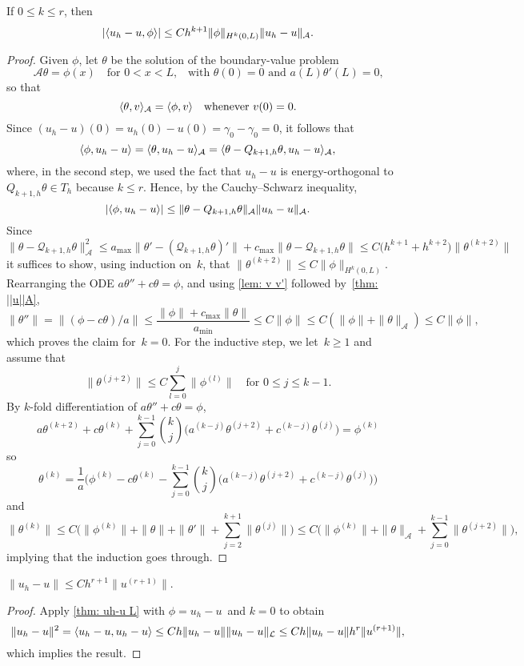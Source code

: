 \begin{theorem}
If $0\le k\le r$, then
\[
|\langle u_h-u,\phi\rangle|\le Ch^{k+1}\|\phi\|_{H^k(0,L)}\|u_h-u\|_{\mathcal{A}}.
\]
\end{theorem}
\begin{proof}
Given $\phi$, let $\theta$ be the solution of the boundary-value problem
\[
\mathcal{A}\theta=\phi(x)\quad\text{for $0<x<L$,}
	\quad\text{with $\theta(0)=0$ and $a(L)\theta'(L)=0$,}
\]
so that
\[
\langle\theta,v\rangle_{\mathcal{A}}=\langle\phi,v\rangle\quad\text{whenever $v(0)=0$.}
\]
Since $(u_h-u)(0)=u_h(0)-u(0)=\gamma_0-\gamma_0=0$, it follows that
\[
\langle\phi,u_h-u\rangle=\langle\theta,u_h-u\rangle_{\mathcal{A}}
	=\langle\theta-Q_{k+1,h}\theta,u_h-u\rangle_{\mathcal{A}},
\]
where, in the second step, we used the fact that $u_h-u$ is energy-orthogonal
to $Q_{k+1,h}\theta\in T_h$ because $k\le r$.  Hence, by the Cauchy--Schwarz 
inequality,
\[
|\langle\phi,u_h-u\rangle|\le\|\theta-Q_{k+1,h}\theta\|_{\mathcal{A}}
	\|u_h-u\|_{\mathcal{A}}.
\]
Since
\[
\|\theta-\mathcal{Q}_{k+1,h}\theta\|_{\mathcal{A}}^2
	\le a_{\max}\|\theta'-(\mathcal{Q}_{k+1,h}\theta)'\|
	+c_{\max}\|\theta-\mathcal{Q}_{k+1,h}\theta\|
	\le C\bigl(h^{k+1}+h^{k+2})\|\theta^{(k+2)}\|
\]
it suffices to show, using induction on~$k$, that 
$\|\theta^{(k+2)}\|\le C\|\phi\|_{H^k(0,L)}$.  
Rearranging the ODE $a\theta''+c\theta=\phi$,  and using \cref{lem: v v'} 
followed by~\cref{thm: ||u||A},
\[
\|\theta''\|=\|(\phi-c\theta)/a\|
	\le\frac{\|\phi\|+c_{\max}\|\theta\|}{a_{\min}}\le C\|\phi\|
	\le C(\|\phi\|+\|\theta\|_{\mathcal{A}})\le C\|\phi\|,
\]
which proves the claim for~$k=0$.  For the inductive step, we let~$k\ge1$ and
assume that 
\[
\|\theta^{(j+2)}\|\le C\sum_{l=0}^j\|\phi^{(l)}\|
	\quad\text{for~$0\le j\le k-1$.}
\]
By $k$-fold differentiation of $a\theta''+c\theta=\phi$, 
\[
a\theta^{(k+2)}+c\theta^{(k)}+\sum_{j=0}^{k-1}\binom{k}{j}\bigl(
	a^{(k-j)}\theta^{(j+2)}+c^{(k-j)}\theta^{(j)}\bigr)=\phi^{(k)}
\]
so
\[
\theta^{(k)}=\frac{1}{a}\bigg(\phi^{(k)}-c\theta^{(k)}
	-\sum_{j=0}^{k-1}\binom{k}{j}\bigl(
	a^{(k-j)}\theta^{(j+2)}+c^{(k-j)}\theta^{(j)}\bigr)\biggr)
\]
and
\[
\|\theta^{(k)}\|\le C\biggl(\|\phi^{(k)}\|+\|\theta\|+\|\theta'\|
	+\sum_{j=2}^{k+1}\|\theta^{(j)}\|\biggr)
\le C\biggl(\|\phi^{(k)}\|+\|\theta\|_{\mathcal{A}}
	+\sum_{j=0}^{k-1}\|\theta^{(j+2)}\|\biggr),
\]
implying that the induction goes through.
\end{proof}

\begin{corollary}
$\|u_h-u\|\le Ch^{r+1}\|u^{(r+1)}\|$.
\end{corollary}
\begin{proof}
Apply \cref{thm: uh-u L} with $\phi=u_h-u$~and $k=0$ to obtain
\[
\|u_h-u\|^2=\langle u_h-u,u_h-u\rangle\le Ch\|u_h-u\|\|u_h-u\|_{\mathcal{L}}
	\le Ch\|u_h-u\|h^r\|u^{(r+1)}\|,
\]
which implies the result.
\end{proof}

